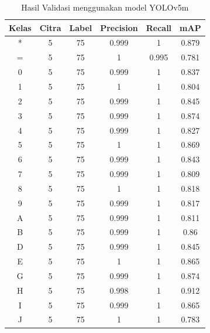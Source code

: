 \begin{center}
  \begin{longtable}[c]{|c|c|c|c|c|c|}
    \caption{Hasil Validasi menggunakan model YOLOv5m}
    \label{tb:valresultyolov5m}\\
    \hline
    \textbf{Kelas} & \textbf{Citra} & \textbf{Label} & \textbf{Precision} & \textbf{Recall} & \textbf{mAP} \\ \hline
    \endhead
    *      & 5      & 75     & 0.999      & 1      & 0.879    \\ \hline
    =      & 5      & 75     & 1          & 0.995  & 0.781    \\ \hline
    0      & 5      & 75     & 0.999      & 1      & 0.837    \\ \hline
    1      & 5      & 75     & 1          & 1      & 0.804    \\ \hline
    2      & 5      & 75     & 0.999      & 1      & 0.845    \\ \hline
    3      & 5      & 75     & 0.999      & 1      & 0.874    \\ \hline
    4      & 5      & 75     & 0.999      & 1      & 0.827    \\ \hline
    5      & 5      & 75     & 1          & 1      & 0.869    \\ \hline
    6      & 5      & 75     & 0.999      & 1      & 0.843    \\ \hline
    7      & 5      & 75     & 0.999      & 1      & 0.809    \\ \hline
    8      & 5      & 75     & 1          & 1      & 0.818    \\ \hline
    9      & 5      & 75     & 0.999      & 1      & 0.817    \\ \hline
    A      & 5      & 75     & 0.999      & 1      & 0.811    \\ \hline
    B      & 5      & 75     & 0.999      & 1      & 0.86     \\ \hline
    D      & 5      & 75     & 0.999      & 1      & 0.845    \\ \hline
    E      & 5      & 75     & 1          & 1      & 0.865    \\ \hline
    G      & 5      & 75     & 0.999      & 1      & 0.874    \\ \hline
    H      & 5      & 75     & 0.998      & 1      & 0.912    \\ \hline
    I      & 5      & 75     & 0.999      & 1      & 0.865    \\ \hline
    J      & 5      & 75     & 1          & 1      & 0.783    \\ \hline

\end{longtable}
\end{center}

